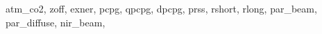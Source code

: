                                                                  atm_co2,                                                                                                                                                                                                                                                                               zoff,                                                                                                                                                                                                                                                                                           exner,                                                                                                                                                                                                                                                                                       pcpg,                                                                                                                                                                                                                                                                                           qpcpg,                                                                                                                                                                                                                                                                                       dpcpg,                                                                                                                                                                                                                                                                                       prss,                                                                                                                                                                                                                                                                                           rshort,                                                                                                                                                                                                                                                                               rlong,                                                                                                                                                                                                                                                                                       par_beam,                                                                                                                                                                                                                                                                           par_diffuse,                                                                                                                                                                                                                                                               nir_beam,                                                                                                                                                              